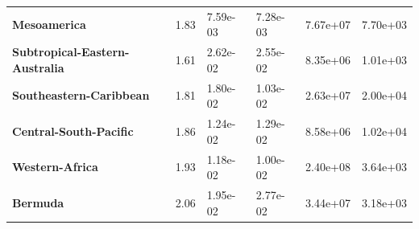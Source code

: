 \begin{table}[H]
{\begin{tabular}{llllll}
            \\
            \textbf{Mesoamerica}                                & 1.83
                                                                & 7.59e-03
                                                                & 7.28e-03
                                                                & 7.67e+07
                                                                & 7.70e+03
            \\
            \textbf{Subtropical-Eastern-Australia}              & 1.61
                                                                & 2.62e-02
                                                                &
            2.55e-02                                            & 8.35e+06
                                                                & 1.01e+03
            \\
            \textbf{Southeastern-Caribbean}                     & 1.81
                                                                & 1.80e-02
                                                                & 1.03e-02
                                                                & 2.63e+07
                                                                & 2.00e+04
            \\
            \textbf{Central-South-Pacific}                      & 1.86
                                                                & 1.24e-02
                                                                & 1.29e-02
                                                                & 8.58e+06
                                                                & 1.02e+04
            \\
            \textbf{Western-Africa}                             & 1.93
                                                                & 1.18e-02
                                                                & 1.00e-02
                                                                & 2.40e+08
                                                                & 3.64e+03
            \\
            \textbf{Bermuda}                                    & 2.06
                                                                & 1.95e-02
                                                                & 2.77e-02
                                                                & 3.44e+07
                                                                & 3.18e+03
            \\

\end{tabular}}
\end{table}
